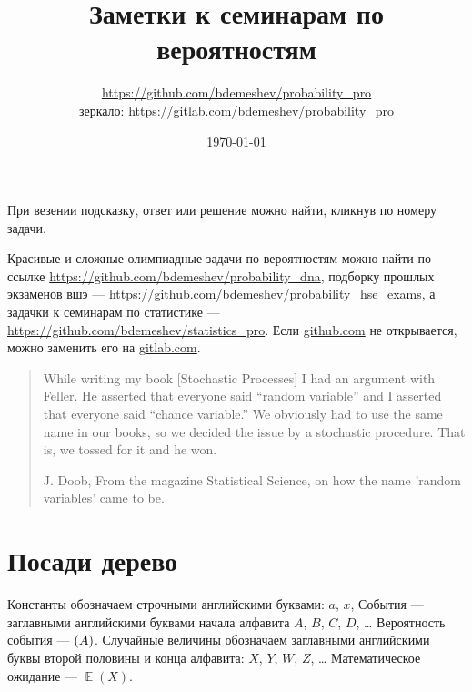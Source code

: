 \documentclass[12pt, a4paper]{article}
\title{Заметки к семинарам по вероятностям}
\author{\url{https://github.com/bdemeshev/probability_pro} \\
зеркало: \url{https://gitlab.com/bdemeshev/probability_pro}}
\date{\today}
\let\P\relax
\DeclareMathOperator{\P}{\mathbb{P}}
\DeclareMathOperator{\E}{\mathbb{E}}
\begin{document}
\maketitle %


\newpage
\tableofcontents{}

\newpage

При везении подсказку, ответ или решение можно найти, кликнув по номеру задачи. 

Красивые и сложные олимпиадные задачи по вероятностям можно найти по ссылке \url{https://github.com/bdemeshev/probability_dna},
подборку прошлых экзаменов вшэ — \url{https://github.com/bdemeshev/probability_hse_exams},
а задачки к семинарам по статистике — \url{https://github.com/bdemeshev/statistics_pro}.
Если \url{github.com} не открывается, можно заменить его на \url{gitlab.com}.


\begin{verse}
  \begin{flushright}
    While writing my book [Stochastic Processes] I had an argument with Feller. 
    He asserted that everyone said ``random variable'' and I asserted that everyone said ``chance variable.'' 
    We obviously had to use the same name in our books, so we decided the issue by a stochastic procedure. 
    That is, we tossed for it and he won.

    J. Doob, From the magazine Statistical Science, on how the name 'random variables' came to be.
  \end{flushright}
\end{verse}


\section{Посади дерево}

\begin{leftbar}
Константы обозначаем строчными английскими буквами: $a$, $x$, События ­— заглавными английскими буквами начала алфавита $A$, $B$, $C$, $D$, \ldots{ } Вероятность события — $\P(A)$.
Случайные величины обозначаем заглавными английскими буквы второй половины и конца алфавита: $X$, $Y$, $W$, $Z$, \ldots{ } Математическое ожидание — $\E(X)$.
\end{leftbar}
\end{document}
